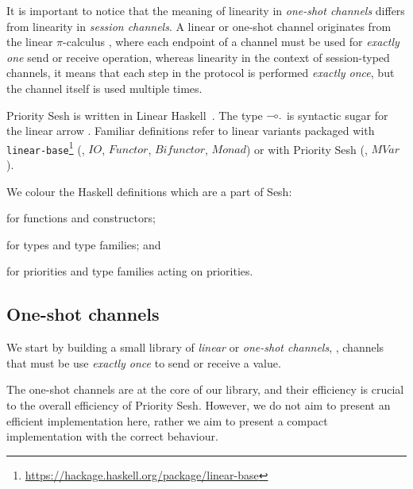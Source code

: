 \documentclass[sigplan,screen]{acmart}
\newcommand{\Conid}[1]{\mathit{#1}}
\newcommand*\hsUnrestrictedArrow[3]{#1}
\newcommand*\hsLinearArrow[3]{#2\global\let\hsArrow=\hsUnrestrictedArrow}
\newcommand\hsPercent{%
  \global\let\hsOne=\hsOneAfterPercentCmd}
\newcommand*\hsOneAfterPercentCmd{%
  \global\let\hsOne=1
  \global\let\hsArrow=\hsLinearArrow}
\begin{document}
It is important to notice that the meaning of linearity in \emph{one-shot channels} differs from linearity in \emph{session channels}. A linear or one-shot channel originates from the linear $\pi$-calculus \cite{KPT99,sangiorgiwalker01}, where each endpoint of a channel must be used for \emph{exactly one} send or receive operation, whereas linearity in the context of session-typed channels, it means that each step in the protocol is performed \emph{exactly once}, but the channel itself is used multiple times.

Priority Sesh is written in Linear Haskell~\cite{bernardyboespflug18}. The type \ensuremath{\hsPercent \hsOne \hsArrow{\rightarrow }{\multimap }{\mathpunct{.}}} is syntactic sugar for the linear arrow . Familiar definitions refer to linear variants packaged with \texttt{linear-base}\footnote{\url{https://hackage.haskell.org/package/linear-base}} (\eg, \ensuremath{\Conid{IO}}, \ensuremath{\Conid{Functor}}, \ensuremath{\Conid{Bifunctor}}, \ensuremath{\Conid{Monad}}) or with Priority Sesh (\eg, \ensuremath{\Conid{MVar}}).

We colour the Haskell definitions which are a part of Sesh:
\begin{itemize*}[font=\bfseries]
\item[\tm{red}] for functions and constructors;
\item[\ty{blue}] for types and type families; and
\item[\cs{emerald}] for priorities and type families acting on priorities.
\end{itemize*}

\subsection{One-shot channels}\label{sec:one-shot}

We start by building a small library of \emph{linear} or \emph{one-shot channels}, \ie, channels that must be use \emph{exactly once} to send or receive a value.

The one-shot channels are at the core of our library, and their efficiency is crucial to the overall efficiency of Priority Sesh. However, we do not aim to present an efficient implementation here, rather we aim to present a compact implementation with the correct behaviour.
\end{document}

